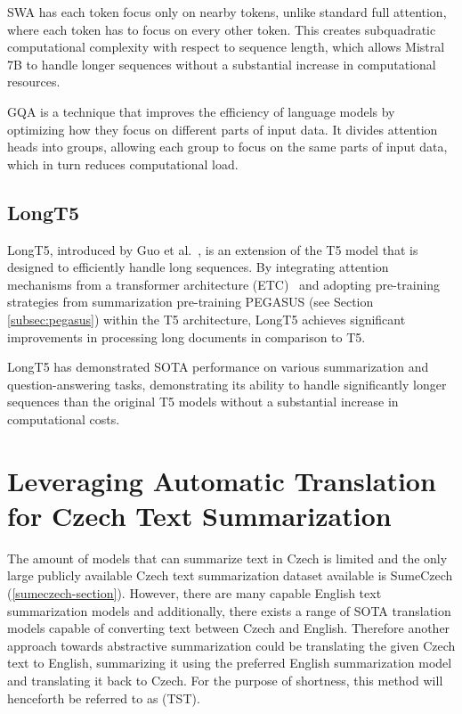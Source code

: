 \documentclass[english, ba, kiv, he, iso690numb, pdf, viewonly]{fasthesis}
\begin{document}
SWA has each token focus only on nearby tokens, unlike standard full attention, where each token has to focus on every other token. This creates subquadratic computational complexity with respect to sequence length, which allows Mistral 7B to handle longer sequences without a substantial increase in computational resources.

GQA is a technique that improves the efficiency of language models by optimizing how they focus on different parts of input data. It divides attention heads into groups, allowing each group to focus on the same parts of input data, which in turn reduces computational load.

\subsection{LongT5}
LongT5, introduced by Guo et al.~\cite{guo2022longt5}, is an extension of the T5 model that is designed to efficiently handle long sequences. By integrating attention mechanisms from a transformer architecture  (ETC)~\cite{ainslie2020etc} and adopting pre-training strategies from summarization pre-training PEGASUS (see Section \ref{subsec:pegasus}) within the T5 architecture, LongT5 achieves significant improvements in processing long documents in comparison to T5. 

LongT5 has demonstrated SOTA performance on various summarization and question-answering tasks, demonstrating its ability to handle significantly longer sequences than the original T5 models without a substantial increase in computational costs.

\section{Leveraging Automatic Translation for Czech Text Summarization}\label{methods:translate}
The amount of models that can summarize text in Czech is limited and the only large publicly available Czech text summarization dataset available is SumeCzech (\ref{sumeczech-section}). However, there are many capable English text summarization models and additionally, there exists a range of SOTA translation models capable of converting text between Czech and English. Therefore another approach towards abstractive summarization could be translating the given Czech text to English, summarizing it using the preferred English summarization model and translating it back to Czech. For the purpose of shortness, this method will henceforth be referred to as  (TST).
\end{document}

